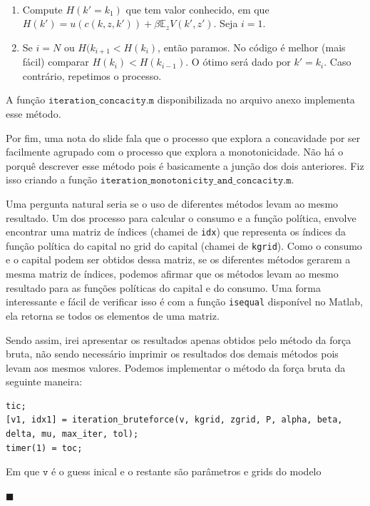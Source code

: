 \documentclass[10pt]{article}
\newcommand*{\QEDA}{\hfill\ensuremath{\blacksquare}}%
\newcommand\E{\mathbb{E}}
\newcommand\0{\mathbf{0}}
\newenvironment{sol}
    {\\[1em] {\color{magenta}\text{Resposta.}}
    }
    {{\color{blue!50!black}\QEDA}}
\begin{document}
\begin{enumerate}[wide]
\begin{sol}
\begin{enumerate}
\item Compute $H(k' = k_1)$ que tem valor conhecido, em que $H(k') = u(c(k,z,k')) + \beta \E_z V(k',z')$. Seja $i = 1$.

\item Se $i = N$ ou $H(k_{i+1} < H(k_i)$, então paramos. No código é melhor (mais fácil) comparar $H(k_i) < H(k_{i-1})$. O ótimo será dado por $k' = k_i$. Caso contrário, repetimos o processo. 
\end{enumerate}

A função $\texttt{iteration\_concacity.m}$ disponibilizada no arquivo anexo implementa esse método.

Por fim, uma nota do slide fala que o processo que explora a concavidade por ser facilmente agrupado com o processo que explora a monotonicidade. Não há o porquê descrever esse método pois é basicamente a junção dos dois anteriores. Fiz isso criando a função $\texttt{iteration\_monotonicity\_and\_concacity.m}$.


Uma pergunta natural seria se o uso de diferentes métodos levam ao mesmo resultado. Um dos processo para calcular o consumo e a função política, envolve encontrar uma matriz de índices (chamei de \texttt{idx}) que representa os índices da função política do capital no grid do capital (chamei de \texttt{kgrid}). Como o consumo e o capital podem ser obtidos dessa matriz, se os diferentes métodos gerarem a mesma matriz de índices, podemos afirmar que os métodos levam ao mesmo resultado para as funções políticas do capital e do consumo. Uma forma interessante e fácil de verificar isso é com a função \texttt{isequal} disponível no Matlab, ela retorna se todos os elementos de uma matriz.

Sendo assim, irei apresentar os resultados apenas obtidos pelo método da força bruta, não sendo necessário imprimir os resultados dos demais métodos pois levam aos mesmos valores. Podemos implementar o método da força bruta da seguinte maneira:

\begin{lstlisting}
tic;
[v1, idx1] = iteration_bruteforce(v, kgrid, zgrid, P, alpha, beta, delta, mu, max_iter, tol);
timer(1) = toc;
\end{lstlisting}

Em que $\texttt{v}$ é o guess inical e o restante são parâmetros e grids do modelo \newpage



\end{sol}
\end{enumerate}
\end{document}
